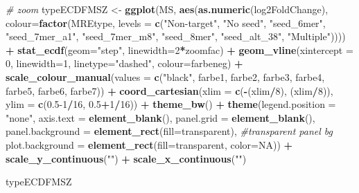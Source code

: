 \documentclass[
]{article}
\newenvironment{Shaded}{\begin{snugshade}}{\end{snugshade}}
\newcommand{\AttributeTok}[1]{\textcolor[rgb]{0.13,0.29,0.53}{#1}}
\newcommand{\CommentTok}[1]{\textcolor[rgb]{0.56,0.35,0.01}{\textit{#1}}}
\newcommand{\ConstantTok}[1]{\textcolor[rgb]{0.56,0.35,0.01}{#1}}
\newcommand{\DecValTok}[1]{\textcolor[rgb]{0.00,0.00,0.81}{#1}}
\newcommand{\FloatTok}[1]{\textcolor[rgb]{0.00,0.00,0.81}{#1}}
\newcommand{\FunctionTok}[1]{\textcolor[rgb]{0.13,0.29,0.53}{\textbf{#1}}}
\newcommand{\NormalTok}[1]{#1}
\newcommand{\OtherTok}[1]{\textcolor[rgb]{0.56,0.35,0.01}{#1}}
\newcommand{\SpecialCharTok}[1]{\textcolor[rgb]{0.81,0.36,0.00}{\textbf{#1}}}
\newcommand{\StringTok}[1]{\textcolor[rgb]{0.31,0.60,0.02}{#1}}
\begin{document}
\begin{Shaded}
\begin{Highlighting}[]
\CommentTok{\# zoom}
\NormalTok{typeECDFMSZ }\OtherTok{\textless{}{-}} \FunctionTok{ggplot}\NormalTok{(MS, }\FunctionTok{aes}\NormalTok{(}\FunctionTok{as.numeric}\NormalTok{(log2FoldChange), }
                              \AttributeTok{colour=}\FunctionTok{factor}\NormalTok{(MREtype, }\AttributeTok{levels =} \FunctionTok{c}\NormalTok{(}\StringTok{"Non{-}target"}\NormalTok{, }\StringTok{"No seed"}\NormalTok{, }\StringTok{"seed\_6mer"}\NormalTok{, }\StringTok{"seed\_7mer\_a1"}\NormalTok{, }\StringTok{"seed\_7mer\_m8"}\NormalTok{, }\StringTok{"seed\_8mer"}\NormalTok{, }\StringTok{"seed\_alt\_38"}\NormalTok{, }\StringTok{"Multiple"}\NormalTok{)))) }\SpecialCharTok{+} 
  \FunctionTok{stat\_ecdf}\NormalTok{(}\AttributeTok{geom=}\StringTok{"step"}\NormalTok{, }\AttributeTok{linewidth=}\DecValTok{2}\SpecialCharTok{*}\NormalTok{zoomfac) }\SpecialCharTok{+}
  \FunctionTok{geom\_vline}\NormalTok{(}\AttributeTok{xintercept =} \DecValTok{0}\NormalTok{, }\AttributeTok{linewidth=}\DecValTok{1}\NormalTok{, }\AttributeTok{linetype=}\StringTok{"dashed"}\NormalTok{, }\AttributeTok{colour=}\NormalTok{farbeneg) }\SpecialCharTok{+}
  \FunctionTok{scale\_colour\_manual}\NormalTok{(}\AttributeTok{values =} \FunctionTok{c}\NormalTok{(}\StringTok{"black"}\NormalTok{, farbe1, farbe2, farbe3, farbe4, farbe5, farbe6, farbe7)) }\SpecialCharTok{+}
  \FunctionTok{coord\_cartesian}\NormalTok{(}\AttributeTok{xlim =} \FunctionTok{c}\NormalTok{(}\SpecialCharTok{{-}}\NormalTok{(xlim}\SpecialCharTok{/}\DecValTok{8}\NormalTok{), (xlim}\SpecialCharTok{/}\DecValTok{8}\NormalTok{)), }\AttributeTok{ylim =} \FunctionTok{c}\NormalTok{(}\FloatTok{0.5}\DecValTok{{-}1}\SpecialCharTok{/}\DecValTok{16}\NormalTok{, }\FloatTok{0.5}\SpecialCharTok{+}\DecValTok{1}\SpecialCharTok{/}\DecValTok{16}\NormalTok{)) }\SpecialCharTok{+} 
  \FunctionTok{theme\_bw}\NormalTok{() }\SpecialCharTok{+}
  \FunctionTok{theme}\NormalTok{(}\AttributeTok{legend.position =} \StringTok{"none"}\NormalTok{, }\AttributeTok{axis.text =} \FunctionTok{element\_blank}\NormalTok{(), }\AttributeTok{panel.grid =} \FunctionTok{element\_blank}\NormalTok{(),}
        \AttributeTok{panel.background =} \FunctionTok{element\_rect}\NormalTok{(}\AttributeTok{fill=}\StringTok{\textquotesingle{}transparent\textquotesingle{}}\NormalTok{), }\CommentTok{\#transparent panel bg}
        \AttributeTok{plot.background =} \FunctionTok{element\_rect}\NormalTok{(}\AttributeTok{fill=}\StringTok{\textquotesingle{}transparent\textquotesingle{}}\NormalTok{, }\AttributeTok{color=}\ConstantTok{NA}\NormalTok{)) }\SpecialCharTok{+}
  \FunctionTok{scale\_y\_continuous}\NormalTok{(}\StringTok{""}\NormalTok{) }\SpecialCharTok{+} \FunctionTok{scale\_x\_continuous}\NormalTok{(}\StringTok{""}\NormalTok{)}

\NormalTok{typeECDFMSZ}
\end{Highlighting}
\end{Shaded}
\end{document}
